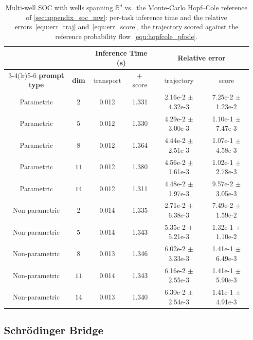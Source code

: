 \documentclass[preprint]{elsarticle}
\newcommand{\R}{\mathbb{R}}
\begin{document}
\begin{table}[!htpb]
    \centering
    \caption{Multi-well SOC with wells spanning $\R^d$ vs.\ the Monte-Carlo
    Hopf--Cole reference of \ref{sec:appendix_soc_mw}: per-task inference time
    and the relative errors~\eqref{equ:err_traj} and~\eqref{equ:err_score}, the
    trajectory scored against the reference probability
    flow~\eqref{equ:hopfcole_pfode}. }
    \label{tab:mwsoc_error}
    \begin{tabular}{cccccc}
        \toprule
         & & \multicolumn{2}{c}{\textbf{Inference Time (s)}}
            & \multicolumn{2}{c}{\textbf{Relative error}} \\
        \cmidrule(lr){3-4}\cmidrule(lr){5-6}
        \textbf{prompt type} & \textbf{dim} & transport & $+$\,score
            & trajectory & score \\
        \midrule
        Parametric & $2$ & 0.012 & 1.331 & 2.16e-2 $\pm$ 4.32e-3 & 7.25e-2 $\pm$ 1.23e-2 \\
        Parametric & $5$ & 0.012 & 1.330 & 4.29e-2 $\pm$ 3.00e-3 & 1.10e-1 $\pm$ 7.47e-3 \\
        Parametric & $8$ & 0.012 & 1.364 & 4.44e-2 $\pm$ 2.51e-3 & 1.07e-1 $\pm$ 4.58e-3 \\
        Parametric & $11$ & 0.012 & 1.380 & 4.56e-2 $\pm$ 1.61e-3 & 1.02e-1 $\pm$ 2.78e-3 \\
        Parametric & $14$ & 0.012 & 1.311 & 4.48e-2 $\pm$ 1.97e-3 & 9.57e-2 $\pm$ 3.05e-3 \\
        \midrule
        Non-parametric & $2$ & 0.014 & 1.335 & 2.71e-2 $\pm$ 6.38e-3 & 7.49e-2 $\pm$ 1.59e-2 \\
        Non-parametric & $5$ & 0.014 & 1.343 & 5.35e-2 $\pm$ 5.21e-3 & 1.32e-1 $\pm$ 1.10e-2 \\
        Non-parametric & $8$ & 0.013 & 1.346 & 6.02e-2 $\pm$ 3.33e-3 & 1.41e-1 $\pm$ 6.49e-3 \\
        Non-parametric & $11$ & 0.014 & 1.343 & 6.16e-2 $\pm$ 2.55e-3 & 1.41e-1 $\pm$ 5.90e-3 \\
        Non-parametric & $14$ & 0.013 & 1.340 & 6.30e-2 $\pm$ 2.54e-3 & 1.41e-1 $\pm$ 4.91e-3 \\
        \bottomrule
    \end{tabular}
\end{table}

\subsection{Schr\"odinger Bridge}
\label{sec:exp_sb}
\end{document}
